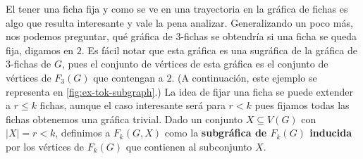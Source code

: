 El tener una ficha fija y como se ve en una trayectoria en la gr\'afica de
fichas es algo que resulta interesante y vale la pena analizar. Generalizando un
poco m\'as, nos podemos preguntar, qu\'e gr\'afica de $3$-fichas se obtendr\'ia si
una ficha se queda fija, digamos en $2$. Es f\'acil notar que esta gr\'afica es
una sugr\'afica de la gr\'afica de $3$-fichas de $G$, pues el conjunto de
v\'ertices de esta gr\'afica es el conjunto de v\'ertices de $F_3(G)$ que
contengan a $2$. (A continuaci\'on, este ejemplo se representa en
\cref{fig:ex-tok-subgraph}.) La idea de fijar una ficha se puede extender a
$r\leq k$ fichas, aunque el caso interesante ser\'a para $r<k$ pues fijamos
todas las fichas obtenemos una gr\'afica trivial. Dado un conjunto $X \subseteq
V(G)$ con $|X|=r<k$, definimos a $F_k(G,X)$ como la \textbf{subgr\'afica de
$F_k(G)$ inducida} por los v\'ertices de $F_k(G)$ que
contienen al subconjunto $X$. 

